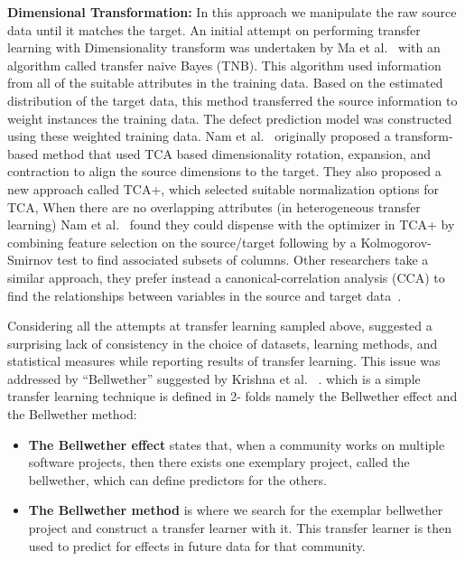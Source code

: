 \documentclass[10pt,journal,compsoc]{IEEEtran}
\newcommand{\bi}{\begin{itemize}}
\newcommand{\ei}{\end{itemize}}
\begin{document}
\textbf{Dimensional Transformation:} In this approach we manipulate the raw source data until it matches the target. An initial attempt on performing transfer learning with Dimensionality transform was undertaken by Ma et al.~\cite{Ma2012} with an algorithm called transfer naive Bayes (TNB). This algorithm used information from all of the suitable attributes in the training data. Based on the estimated distribution of the target data, this method transferred the source information to weight instances the training data. The defect prediction model was constructed using these weighted training data. Nam et al.~\cite{Nam13} originally proposed a transform-based method that used TCA based dimensionality rotation, expansion, and contraction to align the source dimensions to the target. They also proposed a new approach called TCA+, which selected suitable normalization options for TCA, When there are no overlapping attributes (in heterogeneous transfer learning) Nam et al.~\cite{Nam2015} found they could dispense with the optimizer in TCA+ by combining feature selection on the source/target following by a Kolmogorov-Smirnov test to find associated subsets of columns. Other researchers take a similar approach, they prefer instead a canonical-correlation analysis (CCA) to find the relationships between variables in the source and target data~\cite{jing2015heterogeneous}.


Considering all the attempts at transfer learning sampled above, suggested a surprising lack of consistency in the choice of datasets, learning methods, and statistical measures while reporting results of transfer learning. This issue was addressed by ``Bellwether'' suggested by Krishna et al. ~\cite{krishna2017simpler,krishna16}. which is a simple transfer learning technique is defined in 2- folds namely the Bellwether effect and the Bellwether method:

\bi

    \item \textbf{The Bellwether effect} states that, when a community works on multiple software projects,  then there exists one exemplary project, called the bellwether, which can define predictors for the others.
    
    \item \textbf{The Bellwether method} is where we search for the exemplar bellwether project and construct a transfer learner with it. This transfer learner is then used to predict for effects in future data for that community.

\ei
\end{document}

